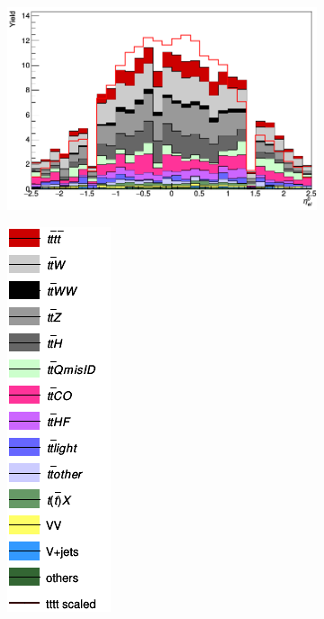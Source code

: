 \begin{figure}[H]
\begin{subfigure}{.5\textwidth}
  \centering
  \includegraphics[width=.99\linewidth]{figs/featuresRNN/el_eta_0}
\end{subfigure}%
\begin{subfigure}{.5\textwidth}
  \centering
  \includegraphics[width=.29\linewidth]{figs/featuresRNN/Legend_wo}
\end{subfigure}
\begin{subfigure}{.5\textwidth}

\end{subfigure}
\end{figure}

